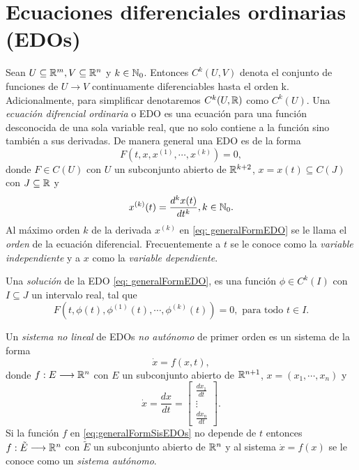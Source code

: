     \section{Ecuaciones diferenciales ordinarias (EDOs)}
    Sean $U \subseteq {\mathbb{R}}^{m}, V \subseteq {\mathbb{R}}^{n}$ y $k\in {\mathbb{N}}_{0}$. Entonces $C^{k}(U, V)$ denota el conjunto de funciones de $U \longrightarrow V$ continuamente diferenciables hasta el orden k. Adicionalmente, para simplificar denotaremos $C^{k}(U, {\mathbb{R}})$ como $C^{k}(U)$. Una \textit{ecuación difrencial ordinaria} o EDO es una ecuación para una función desconocida de una sola variable real, que no solo contiene a la función sino también a sus derivadas. De manera general una EDO es de la forma
    \begin{equation}
    	F(t, x, x^{(1)}, \cdots, x^{(k)}) = 0,
    	\label{eq: generalFormEDO}
    \end{equation}
    donde $F \in C(U)$ con $U$ un subconjunto abierto de ${\mathbb{R}}^{k+2}$, $x = x(t) \subseteq C(J)$ con $J \subseteq {\mathbb{R}}$ y
    \begin{equation*}
    	x^{(k)}(t) = \frac{d^{k}x(t)}{dt^{k}}, k \in {\mathbb{N}}_{0}.
    \end{equation*}
    Al máximo orden $k$ de la derivada $x^{(k)}$ en \eqref{eq: generalFormEDO} se le llama el \textit{orden} de la ecuación diferencial. Frecuentemente a $t$ se le conoce como la \textit{variable independiente} y a $x$ como la \textit{variable dependiente}.
    
    Una \textit{solución} de la EDO \eqref{eq: generalFormEDO}, es una función $\phi \in C^{k}(I)$ con $I \subseteq J$ un intervalo real, tal que
    \begin{equation}
    	F(t, \phi(t), \phi^{(1)}(t), \cdots, \phi^{(k)}(t)) = 0, \text{ para todo } t \in I.
    \end{equation}
    
    Un \textit{sistema no lineal} de EDOs \textit{no autónomo} de primer orden es un sistema de la forma
    \begin{equation}
    	\dot{x} = f(x, t),
    	\label{eq:generalFormSisEDOs}
    \end{equation}
    donde $f:E \longrightarrow {\mathbb{R}}^{n}$ con $E$ un subconjunto abierto de ${\mathbb{R}}^{n+1}$, $x = (x_{1}, \cdots, x_{n})$ y
    \begin{equation*}
    	\dot{x} = \frac{dx}{dt} = 
    	\begin{bmatrix}
    		\frac{dx_{1}}{dt} \\
    		\vdots \\
    		\frac{dx_{n}}{dt}
    	\end{bmatrix}.
    \end{equation*}
    Si la función $f$ en \eqref{eq:generalFormSisEDOs} no depende de $t$ entonces $f:\tilde{E} \longrightarrow {\mathbb{R}}^{n}$ con $\tilde{E}$ un subconjunto abierto de ${\mathbb{R}}^{n}$ y al sistema $\dot{x} = f(x)$ se le conoce como un \textit{sistema autónomo}.
    
